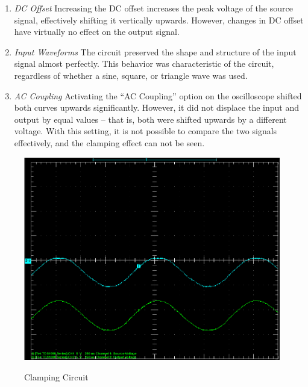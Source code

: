 \documentclass[twocolumn,english]{IEEEtran}
\begin{document}
\begin{enumerate}
  \item
    \textit{DC Offset}
    Increasing the DC offset increases the peak voltage of the source signal, effectively shifting it vertically upwards. However, changes in DC offset have virtually no effect on the output signal.
  \item
    \textit{Input Waveforms}
    The circuit preserved the shape and structure of the input signal almost perfectly. This behavior was characteristic of the circuit, regardless of whether a sine, square, or triangle wave was used.
  \item
    \textit{AC Coupling}
    Activating the ``AC Coupling'' option on the oscilloscope shifted both curves upwards significantly. However, it did not displace the input and output by equal values -- that is, both were shifted upwards by a different voltage. With this setting, it is not possible to compare the two signals effectively, and the clamping effect can not be seen.
\end{enumerate}

\begin{figure}[H]
  \begin{centering}
  \begin{center}
  \includegraphics[width=\linewidth]{./Images/clamping_results.png}
  \label{fig:clamping_results}
  \caption{Clamping Circuit}
  \end{center}
  \par\end{centering}
\end{figure}
\end{document}
